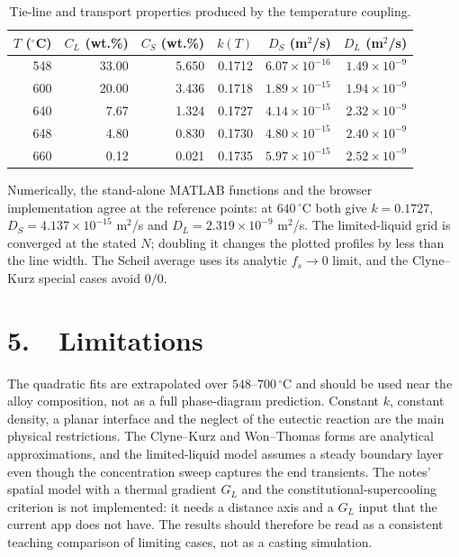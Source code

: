 \documentclass[11pt,a4paper]{article}
\begin{document}
\begin{table}[h]
\centering
\small
\begin{tabular}{@{}rrrrrr@{}}
\toprule
$T$ ($^\circ$C) & $C_L$ (wt.\%) & $C_S$ (wt.\%) & $k(T)$ &
$D_S$ (m$^2$/s) & $D_L$ (m$^2$/s)\\
\midrule
548 & 33.00 & 5.650 & 0.1712 & $6.07\times10^{-16}$ & $1.49\times10^{-9}$\\
600 & 20.00 & 3.436 & 0.1718 & $1.89\times10^{-15}$ & $1.94\times10^{-9}$\\
640 & 7.67  & 1.324 & 0.1727 & $4.14\times10^{-15}$ & $2.32\times10^{-9}$\\
648 & 4.80  & 0.830 & 0.1730 & $4.80\times10^{-15}$ & $2.40\times10^{-9}$\\
660 & 0.12  & 0.021 & 0.1735 & $5.97\times10^{-15}$ & $2.52\times10^{-9}$\\
\bottomrule
\end{tabular}
\caption{Tie-line and transport properties produced by the temperature
coupling.}
\label{tab:temperature}
\end{table}

Numerically, the stand-alone MATLAB functions and the browser implementation
agree at the reference points: at $640\,^\circ$C both give $k=0.1727$,
$D_S=4.137\times10^{-15}$ m$^2$/s and $D_L=2.319\times10^{-9}$ m$^2$/s. The
limited-liquid grid is converged at the stated $N$; doubling it changes the
plotted profiles by less than the line width. The Scheil average uses its
analytic $f_s\to0$ limit, and the Clyne--Kurz special cases avoid $0/0$.

\section*{5.\ \ Limitations}

The quadratic fits are extrapolated over $548$--$700\,^\circ$C and should be
used near the alloy composition, not as a full phase-diagram prediction.
Constant $k$, constant density, a planar interface and the neglect of the
eutectic reaction are the main physical restrictions. The Clyne--Kurz and
Won--Thomas forms are analytical approximations, and the limited-liquid model
assumes a steady boundary layer even though the concentration sweep captures
the end transients. The notes' spatial model with a thermal gradient $G_L$
and the constitutional-supercooling criterion is not implemented: it needs a
distance axis and a $G_L$ input that the current app does not have. The
results should therefore be read as a consistent teaching comparison of
limiting cases, not as a casting simulation.
\end{document}

